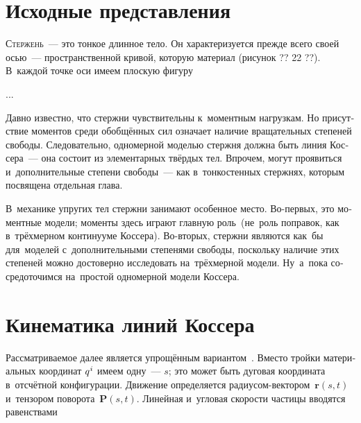 

\thispagestyle{empty}

\label{chapter:rods}

\begin{otherlanguage}{russian}

\section{Исходные представления}
\label{para:overviewofrods}

\lettrine[lines=2, findent=2pt, nindent=0pt]{С}{тержень}~--- это тонкое длинное тело. Он характеризуется прежде всего своей осью~--- пространственной кривой, которую  материал (рисунок ?? 22 ??). В~каждой точке оси имеем плоскую фигуру

...


Давно известно, что стержни чувствительны к~моментным нагрузкам. Но присутствие моментов среди обобщённых сил означает наличие вращательных степеней свободы. Следовательно, одномерной моделью стержня должна быть линия Коссера~--- она состоит из элементарных твёрдых тел. Впрочем, могут проявиться и~дополнительные степени свободы~--- как в~тонкостенных стержнях, которым посвящена отдельная глава.

В~механике упругих тел стержни занимают особенное место. Во\hbox{-}первых, это моментные модели; моменты здесь играют главную роль~(не~роль поправок, как в~трёхмерном континууме Коссера). Во\hbox{-}вторых, стержни являются как~бы  для~моделей с~дополнительными степенями свободы, поскольку наличие этих степеней можно достоверно исследовать на~трёх\-мерной модели. Ну~а~пока сосредоточимся на~простой одномерной модели Коссера.

\section{Кинематика линий Коссера}

Рассматриваемое далее является упрощённым вариантом~. Вместо тройки материальных координат ${q^{\hspace{.1ex}i}}$ имеем одну~--- $s$; это может быть дуговая координата в~отсчётной конфигурации. Движение определяется радиусом-вектором~${\bm{r}(s,t)}$ и~тензором поворота~${\bm{P}(s,t)}$. Линейная и~угловая скорости частицы вводятся равенствами


\end{otherlanguage}
